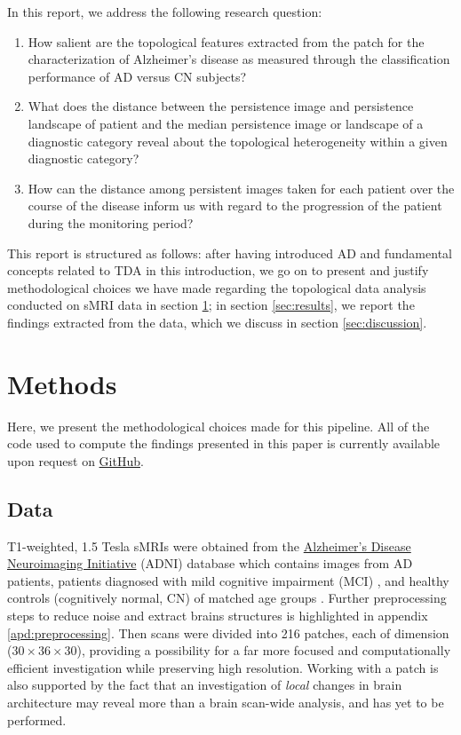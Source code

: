 \documentclass{article}
\begin{document}
In this report, we address the following research question:
\begin{enumerate}
\item How salient are the topological features extracted from the patch for the characterization of Alzheimer's disease as measured through the classification performance of AD versus CN subjects?
\item What does the distance between the persistence image and persistence landscape of patient and the median persistence image or landscape of a diagnostic category reveal about the topological heterogeneity within a given diagnostic category?
\item How can the distance among persistent images taken for each patient over the course of the disease inform us with regard to the progression of the patient during the monitoring period?
\end{enumerate}

This report is structured as follows: after having introduced AD and fundamental concepts related to TDA in this introduction, we go on to present and justify methodological choices we have made regarding the topological data analysis conducted on sMRI data in section \ref{sec:methods}; in section \ref{sec:results}, we report the findings extracted from the data, which we discuss in section \ref{sec:discussion}.

\section{Methods}\label{sec:methods}

Here, we present the methodological choices made for this pipeline. All of the code used to compute the findings presented in this paper is currently available upon request on \href{https://github.com/pjhartout/TDA_ADNI_MLCB}{GitHub}.

\subsection{Data}

T1-weighted, 1.5 Tesla sMRIs were obtained from the \href{adni.loni.usc.edu}{Alzheimer's Disease Neuroimaging Initiative} (ADNI) database which contains images from AD patients, patients diagnosed with mild cognitive impairment (MCI) \citep{gauthier2006mild}, and healthy controls (cognitively normal, CN) of matched age groups \citep{jack2008alzheimer}. Further preprocessing steps to reduce noise and extract brains structures is highlighted in appendix \ref{apd:preprocessing}. Then scans were divided into 216 patches, each of dimension ($30\times36\times30$), providing a possibility for a far more focused and computationally efficient investigation while preserving high resolution. Working with a patch is also supported by the fact that an investigation of \emph{local} changes in brain architecture may reveal more than a brain scan-wide analysis, and has yet to be performed.
\end{document}
